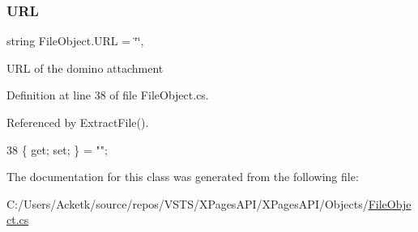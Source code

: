 \subsubsection{\texorpdfstring{U\+RL}{URL}}
{\footnotesize\ttfamily string File\+Object.\+U\+RL = \char`\"{}\char`\"{}\hspace{0.3cm}{\ttfamily [get]}, {\ttfamily [set]}}



U\+RL of the domino attachment 



Definition at line 38 of file File\+Object.\+cs.



Referenced by Extract\+File().


\begin{DoxyCode}
38 \{ \textcolor{keyword}{get}; \textcolor{keyword}{set}; \} = \textcolor{stringliteral}{""};
\end{DoxyCode}


The documentation for this class was generated from the following file\+:\begin{DoxyCompactItemize}
\item 
C\+:/\+Users/\+Acketk/source/repos/\+V\+S\+T\+S/\+X\+Pages\+A\+P\+I/\+X\+Pages\+A\+P\+I/\+Objects/\mbox{\hyperlink{_file_object_8cs}{File\+Object.\+cs}}\end{DoxyCompactItemize}
